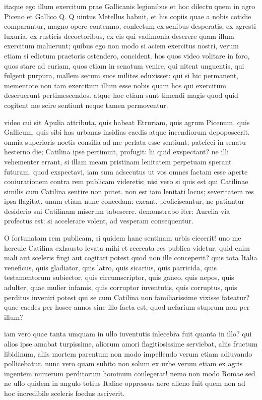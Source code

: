  itaque ego illum exercitum prae Gallicanis legionibus et hoc dilectu quem in agro Piceno et Gallico Q. Q uintus Metellus habuit, et his copiis quae a nobis cotidie comparantur, magno opere contemno, conlectum ex senibus desperatis, ex agresti luxuria, ex rusticis decoctoribus, ex eis qui vadimonia deserere quam illum exercitum maluerunt; quibus ego non modo si aciem exercitus nostri, verum etiam si edictum praetoris ostendero, concident. hos quos video volitare in foro, quos stare ad curiam, quos etiam in senatum venire, qui nitent unguentis, qui fulgent purpura, mallem secum suos milites eduxisset: qui si hic permanent, mementote non tam exercitum illum esse nobis quam hos qui exercitum deseruerunt pertimescendos. atque hoc etiam sunt timendi magis quod quid cogitent me scire sentiunt neque tamen permoventur.

 video cui sit Apulia attributa, quis habeat Etruriam, quis agrum Picenum, quis Gallicum, quis sibi has urbanas insidias caedis atque incendiorum depoposcerit. omnia superioris noctis consilia ad me perlata esse sentiunt; patefeci in senatu hesterno die; Catilina ipse pertimuit, profugit: hi quid exspectant? ne illi vehementer errant, si illam meam pristinam lenitatem perpetuam sperant futuram. quod exspectavi, iam sum adsecutus ut vos omnes factam esse aperte coniurationem contra rem publicam videretis; nisi vero si quis est qui Catilinae similis cum Catilina sentire non putet. non est iam lenitati locus; severitatem res ipsa flagitat. unum etiam nunc concedam: exeant, proficiscantur, ne patiantur desiderio sui Catilinam miserum tabescere. demonstrabo iter: Aurelia via profectus est; si accelerare volent, ad vesperam consequentur.

 O fortunatam rem publicam, si quidem hanc sentinam urbis eiecerit! uno me hercule Catilina exhausto levata mihi et recreata res publica videtur. quid enim mali aut sceleris fingi aut cogitari potest quod non ille conceperit? quis tota Italia veneficus, quis gladiator, quis latro, quis sicarius, quis parricida, quis testamentorum subiector, quis circumscriptor, quis ganeo, quis nepos, quis adulter, quae mulier infamis, quis corruptor iuventutis, quis corruptus, quis perditus inveniri potest qui se cum Catilina non familiarissime vixisse fateatur? quae caedes per hosce annos sine illo facta est, quod nefarium stuprum non per illum?

 iam vero quae tanta umquam in ullo iuventutis inlecebra fuit quanta in illo? qui alios ipse amabat turpissime, aliorum amori flagitiosissime serviebat, aliis fructum libidinum, aliis mortem parentum non modo impellendo verum etiam adiuvando pollicebatur. nunc vero quam subito non solum ex urbe verum etiam ex agris ingentem numerum perditorum hominum conlegerat! nemo non modo Romae sed ne ullo quidem in angulo totius Italiae oppressus aere alieno fuit quem non ad hoc incredibile sceleris foedus asciverit.

